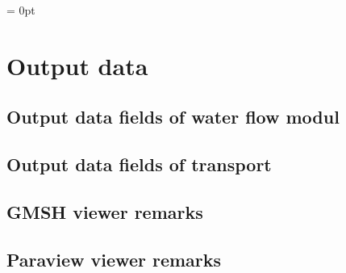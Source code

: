%
%
%
%
\parindent = 0pt

\section*{Output data}
\subsection{Output data fields of water flow modul}
\subsection{Output data fields of transport}

\subsection{GMSH viewer remarks}
\subsection{Paraview viewer remarks}